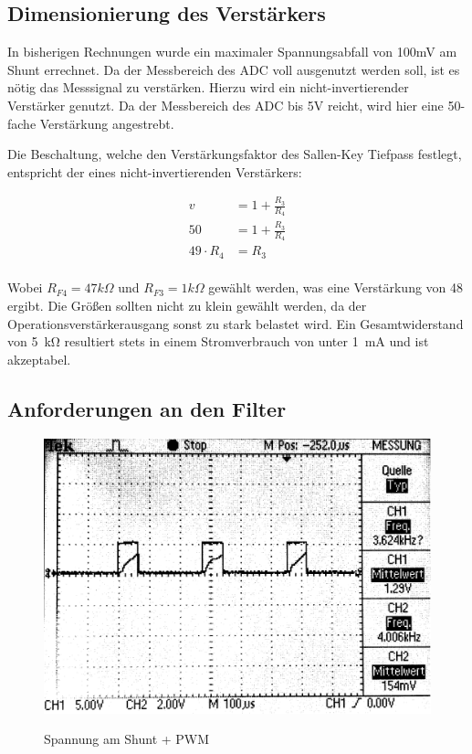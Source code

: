 \subsection{Dimensionierung des Verstärkers}

In bisherigen Rechnungen wurde ein maximaler Spannungsabfall von 100mV am Shunt errechnet. Da der Messbereich des ADC voll ausgenutzt werden soll,
ist es nötig das Messsignal zu verstärken. Hierzu wird ein nicht-invertierender Verstärker genutzt. Da der Messbereich des ADC bis 5V reicht, wird hier eine 
50-fache Verstärkung angestrebt.

Die Beschaltung, welche den Verstärkungsfaktor des Sallen-Key Tiefpass festlegt, entspricht der eines nicht-invertierenden Verstärkers:

\begin{align*}
v &= 1 + \frac{R_{3}}{R_{4}}\\
50 &= 1 + \frac{R_{3}}{R_{4}}\\
49\cdot R_{4} &= R_{3}
\end{align*}
\\
Wobei $R_{F4} = 47 k\Omega$ und $R_{F3} = 1 k\Omega$  gewählt werden, was eine Ver\-stär\-kung von 48 ergibt. Die Größen sollten nicht zu klein gewählt werden, 
da der Operationsverstärkerausgang sonst zu stark belastet wird. Ein Gesamtwiderstand von \SI{5}{\kohm} resultiert stets in einem Stromverbrauch von unter \SI{1}{\mA} und ist
akzeptabel.


\subsection{Anforderungen an den Filter}

\begin{figure}[H]
\centering
\includegraphics[width=.8\textwidth]{oszi.png}\\
\caption{Spannung am Shunt + PWM}%
\label{fig:pwm+i2}
\end{figure}

